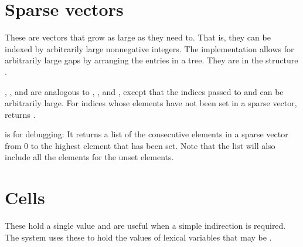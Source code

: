 \begin{protos}
\end{protos}

\section{Sparse vectors}

These are vectors that grow as large as they need to.  That is, they
can be indexed by arbitrarily large nonnegative integers.  The
implementation allows for arbitrarily large gaps by arranging the
entries in a tree.  They are in the structure .

\begin{protos}
\end{protos}
%
, , and
 are analogous to ,
, and , except that the indices
passed to  and  can
be arbitrarily large.  For indices whose elements have not been set in
a sparse vector,  returns .

 is for debugging: It returns a list of the
consecutive elements in a sparse vector from 0 to the highest element
that has been set.  Note that the list will also include all the
 elements for the unset elements.


\section{Cells}
\label{cells}

These hold a single value and are useful when a simple indirection is
 required.
The system uses these to hold the values of lexical variables that
 may be .

\begin{protos}
\end{protos}

